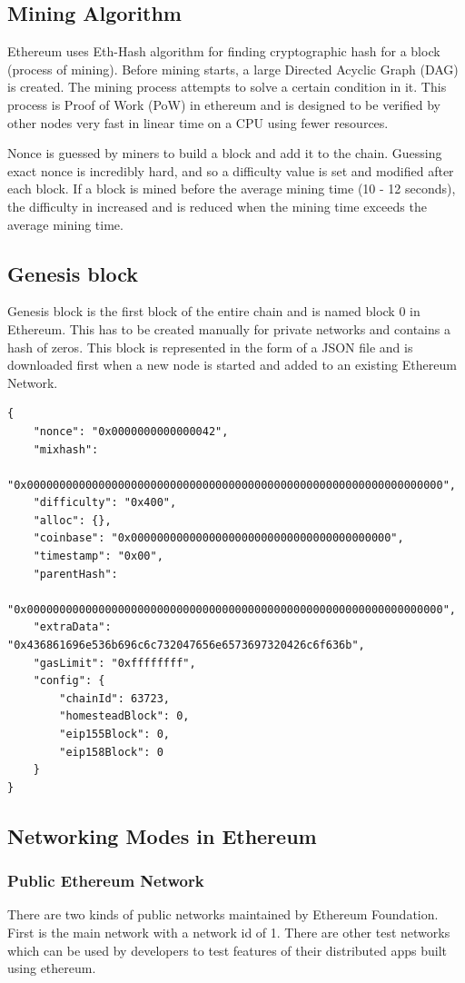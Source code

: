 \documentclass[11pt,openright]{report}
\begin{document}
\subsection{Mining Algorithm}
Ethereum uses Eth-Hash algorithm \cite{wood2014yellow} for finding cryptographic hash for a block (process of mining). Before mining starts, a large Directed Acyclic Graph (DAG) is created. The mining process attempts to solve a certain condition in it. This process is Proof of Work (PoW) in ethereum and is designed to be verified by other nodes very fast in linear time on a CPU using fewer resources.

Nonce is guessed by miners to build a block and add it to the chain. Guessing exact nonce is incredibly hard, and so a difficulty value is set and modified after each block. If a block is mined before the average mining time (10 - 12 seconds), the difficulty in increased and is reduced when the mining time exceeds the average mining time.

\subsection{Genesis block}
Genesis block is the first block of the entire chain and is named block 0 in Ethereum. This has to be created manually for private networks and contains a hash of zeros. This block is represented in the form of a JSON file and is downloaded first when a new node is started and added to an existing Ethereum Network.

\begin{lstlisting}[basicstyle=\small,]
{
    "nonce": "0x0000000000000042",
    "mixhash": 
    "0x0000000000000000000000000000000000000000000000000000000000000000",
    "difficulty": "0x400",
    "alloc": {}, 
    "coinbase": "0x0000000000000000000000000000000000000000",
    "timestamp": "0x00",
    "parentHash": 
    "0x0000000000000000000000000000000000000000000000000000000000000000",
    "extraData": "0x436861696e536b696c6c732047656e6573697320426c6f636b",
    "gasLimit": "0xffffffff",
    "config": {
        "chainId": 63723,
        "homesteadBlock": 0,
        "eip155Block": 0,
        "eip158Block": 0
    }
}
\end{lstlisting}

\subsection{Networking Modes in Ethereum}
\subsubsection{Public Ethereum Network}
There are two kinds of public networks maintained by Ethereum Foundation. 
First is the main network with a network id of 1. There are other test networks which can be used by developers to test features of their distributed apps built using ethereum. 
\end{document}
